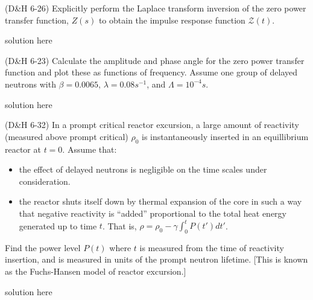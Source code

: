 \documentclass[11pt,addpoints,answers]{exam}
\begin{document}
\begin{questions}
        \question[20] (D\&H 6-26) Explicitly perform the Laplace transform 
        inversion of the zero power transfer function, $Z(s)$ to obtain the 
        impulse response function $\mathscr{Z}(t)$.
                \begin{solution}
                        solution here
                \end{solution}
       
        \question[30] (D\&H 6-23) Calculate the amplitude and phase angle for the 
        zero power transfer function and plot these as functions of frequency. 
        Assume one group of delayed neutrons with $\beta = 0.0065$, $\lambda = 
        0.08s^{-1}$, and $\Lambda = 10^{-4}s$.
                \begin{solution}
                        solution here
                \end{solution}
       
        \question[10] (D\&H 6-32) In a prompt critical reactor excursion, a 
        large amount of reactivity (measured above prompt critical) $\rho_0$ is 
        instantaneously inserted in an equillibrium reactor at $t=0$. Assume 
        that:
        \begin{itemize}
                \item the effect of delayed neutrons is negligible on the time 
                        scales under consideration.
                \item the reactor shuts itself down by thermal expansion of the 
                        core in such a way that negative reactivity is 
                        ``added'' proportional to the total heat energy 
                        generated up to time $t$. That is, $\rho = \rho_0 - 
                        \gamma\int_0^t{P(t')dt'}$. 
        \end{itemize}

        Find the power level $P(t)$  where $t$ is measured from the time of 
        reactivity insertion, and is measured in units of the prompt neutron lifetime.
        [This is known as the Fuchs-Hansen model of reactor excursion.]
                \begin{solution}
                        solution here
                \end{solution}

       
\end{questions}



%
%
\end{document}
